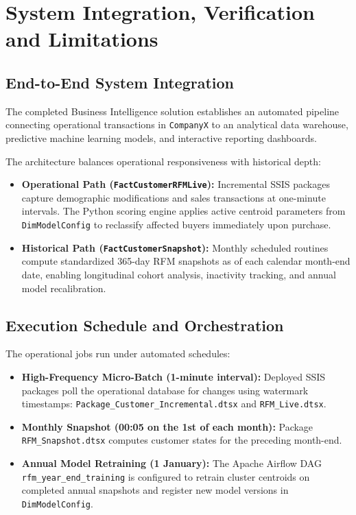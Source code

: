 \chapter{System Integration, Verification and Limitations}\label{chap:integration}

\section{End-to-End System Integration}
The completed Business Intelligence solution establishes an automated pipeline connecting operational transactions in \texttt{CompanyX} to an analytical data warehouse, predictive machine learning models, and interactive reporting dashboards. 

The architecture balances operational responsiveness with historical depth:
\begin{itemize}
    \item \textbf{Operational Path (\texttt{FactCustomerRFMLive}):} Incremental SSIS packages capture demographic modifications and sales transactions at one-minute intervals. The Python scoring engine applies active centroid parameters from \texttt{DimModelConfig} to reclassify affected buyers immediately upon purchase.
    \item \textbf{Historical Path (\texttt{FactCustomerSnapshot}):} Monthly scheduled routines compute standardized 365-day RFM snapshots as of each calendar month-end date, enabling longitudinal cohort analysis, inactivity tracking, and annual model recalibration.
\end{itemize}

\section{Execution Schedule and Orchestration}
The operational jobs run under automated schedules:
\begin{itemize}
    \item \textbf{High-Frequency Micro-Batch (1-minute interval):} Deployed SSIS packages poll the operational database for changes using watermark timestamps: \texttt{Package\_Customer\_}\allowbreak\texttt{Incremental.dtsx} and \texttt{RFM\_Live.dtsx}.
    \item \textbf{Monthly Snapshot (00:05 on the 1st of each month):} Package \texttt{RFM\_Snapshot.dtsx} computes customer states for the preceding month-end.
    \item \textbf{Annual Model Retraining (1 January):} The Apache Airflow DAG \texttt{rfm\_}\allowbreak\texttt{year\_}\allowbreak\texttt{end\_}\allowbreak\texttt{training} is configured to retrain cluster centroids on completed annual snapshots and register new model versions in \texttt{DimModelConfig}.
\end{itemize}

